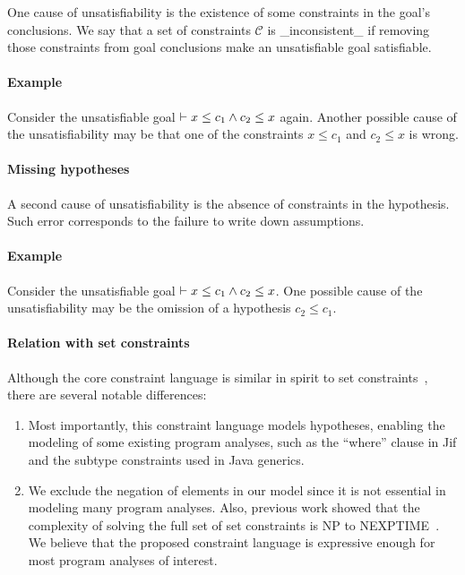 One cause of unsatisfiability is the existence of some constraints
in the goal's conclusions. We say that a set of constraints
$\mathcal{C}$ is _inconsistent_ if removing those constraints from
goal conclusions make an unsatisfiable goal satisfiable.

\paragraph{Example}

Consider the unsatisfiable goal $\vdash x \leq c_1 \land c_2 \leq x$
again. Another possible cause of the unsatisfiability may be that one
of the constraints $x \leq c_1$ and $c_2 \leq x$ is wrong. 

\paragraph{Missing hypotheses}

A second cause of unsatisfiability is the absence of constraints in
the hypothesis. Such error corresponds to the failure to write down
assumptions.

\paragraph{Example}
Consider the unsatisfiable goal $\vdash x \leq c_1 \land c_2 \leq x$.
One possible cause of the unsatisfiability may be the omission of a
hypothesis $c_2\leq c_1$.

\paragraph{Relation with set constraints}

Although the core constraint language is similar in spirit to set
constraints~\cite{aiken-setconstraint}, there are several notable
differences:

\begin{enumerate}

\item Most importantly, this constraint language models hypotheses,
enabling the modeling of some existing program analyses, such as the
``where'' clause in Jif and the subtype constraints used in Java
generics.

\item We exclude the negation of elements in our model since it is not
essential in modeling many program analyses. Also, previous work
showed that the complexity of solving the full set of set constraints
is NP to NEXPTIME~\cite{aiken-complexity}. We believe that the
proposed constraint language is expressive enough for most program
analyses of interest.

\end{enumerate}

